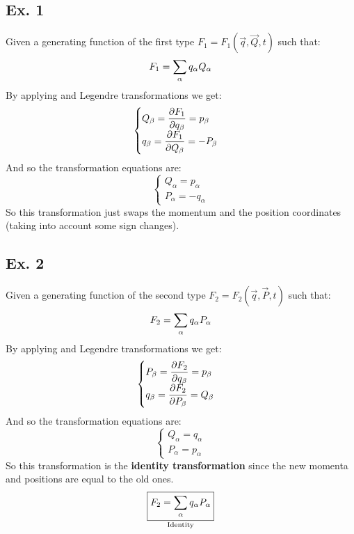 \subsection{Ex. 1}
Given a generating function of the first type $F_1 = F_1(\vec{q},\vec{Q},t)$ such that:
\begin{equation}
    F_1 = \displaystyle\sum_{\alpha} q_{\alpha}Q_{\alpha}
\end{equation}
By applying \hamiltonref\;and Legendre transformations we get:
\begin{equation}
    \begin{cases}
        Q_{\beta} = \dfrac{\partial F_1}{\partial q_{\beta}} = p_{\beta}\\
        q_{\beta} = \dfrac{\partial F_1}{\partial Q_{\beta}} = -P_{\beta}
    \end{cases}
\end{equation}
And so the transformation equations are:
\begin{equation}
    \begin{cases}
        Q_{\alpha} = p_{\alpha}\\
        P_{\alpha} = -q_{\alpha}
    \end{cases}
\end{equation}
So this transformation just swaps the momentum and the position coordinates (taking into account some sign changes).
\subsection{Ex. 2}
Given a generating function of the second type $F_2 = F_2(\vec{q},\vec{P},t)$ such that:
\begin{equation}
    F_2 = \displaystyle\sum_{\alpha} q_{\alpha}P_{\alpha}
\end{equation}
By applying \hamiltonref\;and Legendre transformations we get:
\begin{equation}
    \begin{cases}
        P_{\beta} = \dfrac{\partial F_2}{\partial q_{\beta}} = p_{\beta}\\
        q_{\beta} = \dfrac{\partial F_2}{\partial P_{\beta}} = Q_{\beta}
    \end{cases}
\end{equation}
And so the transformation equations are:
\begin{equation}
    \begin{cases}
        Q_{\alpha} = q_{\alpha}\\
        P_{\alpha} = p_{\alpha}
    \end{cases}
\end{equation}
So this transformation is the \textbf{identity transformation} since the new momenta and positions are equal to the old ones.
\begin{equation}
    \underset{\text{Identity}}{\boxed{F_2 = \displaystyle\sum_{\alpha} q_{\alpha}P_{\alpha}}}
\end{equation}
